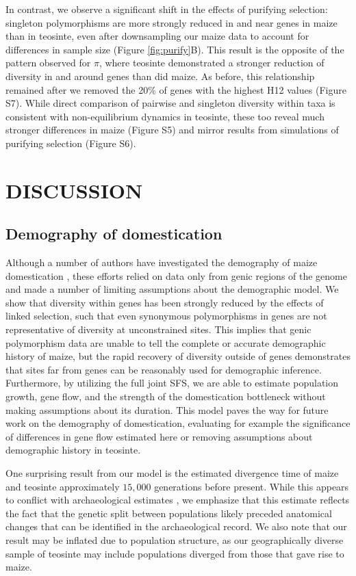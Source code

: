 \documentclass[12pt,a4paper]{article}
\begin{document}
In contrast, we observe a significant shift in the effects of purifying selection: singleton polymorphisms are more strongly reduced in and near genes in maize than in teosinte, even after downsampling our maize data to account for differences in sample size (Figure \ref{fig:purify}B). 
This result is the opposite of the pattern observed for $\pi$, where teosinte demonstrated a stronger reduction of diversity in and around genes than did maize. 
As before, this relationship remained after we removed the 20\% of genes with the highest H12 values (Figure S7).
While direct comparison of pairwise and singleton diversity within taxa is consistent with non-equilibrium dynamics in teosinte, these too reveal much stronger differences in maize (Figure S5) and mirror results from simulations of purifying selection (Figure S6).


\section*{DISCUSSION}


\subsection*{Demography of domestication} %
Although a number of authors have investigated the demography of maize domestication \cite{eyre1998, tenaillon2004, wright2005}, these  efforts relied on data only from genic regions of the genome and made a number of limiting assumptions about the demographic model.  We show that diversity within genes has been strongly reduced by the effects of linked selection, such that even synonymous polymorphisms in genes are not representative of diversity at unconstrained sites. This implies that genic polymorphism data are unable to tell the complete or accurate demographic history of maize, but the rapid recovery of diversity outside of genes demonstrates that sites far from genes can be reasonably used for demographic inference. Furthermore, by utilizing the full joint SFS, we are able to estimate population growth, gene flow, and the strength of the domestication bottleneck without making assumptions about its duration.  
This model paves the way for future work on the demography of domestication, evaluating for example the significance of differences in gene flow estimated here or removing assumptions about demographic history in teosinte.

One surprising result from our model is the estimated divergence time of maize and teosinte approximately $15,000$ generations before present.
While this appears to conflict with archaeological estimates \cite{piperno2009}, we emphasize that this estimate reflects the fact that the genetic split between populations likely preceded anatomical changes that can be identified in the archaeological record. 
We also note that our result may be inflated due to population structure, as our geographically diverse sample of teosinte may include populations diverged from those that gave rise to maize.
\end{document}

